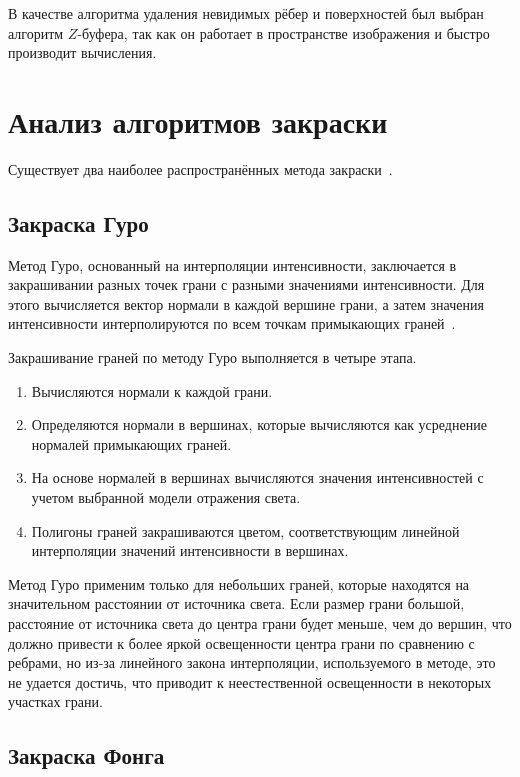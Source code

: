 В качестве алгоритма удаления невидимых рёбер и поверхностей был выбран алгоритм $Z$-буфера, так как он работает в пространстве изображения и быстро производит вычисления.

\clearpage

\section{Анализ алгоритмов закраски}

Существует два наиболее распространённых метода закраски~\cite{roders}.

\subsection{Закраска Гуро}

Метод Гуро, основанный на интерполяции интенсивности, заключается в закрашивании разных точек грани с разными значениями интенсивности. Для этого вычисляется вектор нормали в каждой вершине грани, а затем значения интенсивности интерполируются по всем точкам примыкающих граней~\cite{roders}.

Закрашивание граней по методу Гуро выполняется в четыре этапа. 
\begin{enumerate} [label=\arabic*)]
	\item Вычисляются нормали к каждой грани. 
	\item Определяются нормали в вершинах, которые вычисляются как усреднение нормалей примыкающих граней. 
	\item На основе нормалей в вершинах вычисляются значения интенсивностей с учетом выбранной модели отражения света. 
	\item Полигоны граней закрашиваются цветом, соответствующим линейной интерполяции значений интенсивности в вершинах.
\end{enumerate}

Метод Гуро применим только для небольших граней, которые находятся на значительном расстоянии от источника света. Если размер грани большой, расстояние от источника света до центра грани будет меньше, чем до вершин, что должно привести к более яркой освещенности центра грани по сравнению с ребрами, но из-за линейного закона интерполяции, используемого в методе, это не удается достичь, что приводит к неестественной освещенности в некоторых участках грани.

\subsection{Закраска Фонга}

